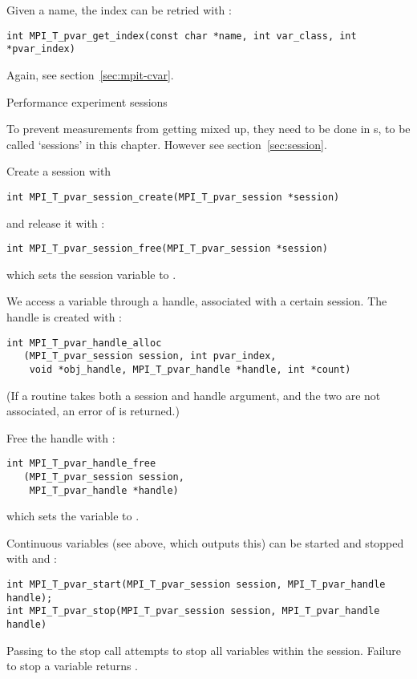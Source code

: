Given a name, the index can be retried with :
\begin{lstlisting}
int MPI_T_pvar_get_index(const char *name, int var_class, int *pvar_index)
\end{lstlisting}
Again, see section~\ref{sec:mpit-cvar}.

 {Performance experiment sessions}

To prevent measurements from getting mixed up, they need to be done in
s,
to be called `sessions' in this chapter.
However see section~\ref{sec:session}.

Create a session with 
\begin{lstlisting}
int MPI_T_pvar_session_create(MPI_T_pvar_session *session)
\end{lstlisting}
and release it with :
\begin{lstlisting}
int MPI_T_pvar_session_free(MPI_T_pvar_session *session)
\end{lstlisting}
which sets the session variable to .

We access a variable through a handle, associated with a certain session.
The handle is created with :
\begin{lstlisting}
int MPI_T_pvar_handle_alloc
   (MPI_T_pvar_session session, int pvar_index,
    void *obj_handle, MPI_T_pvar_handle *handle, int *count)
\end{lstlisting}
(If a routine takes both a session and handle argument, and
the two are not associated, an error of 
is returned.)

Free the handle with :
\begin{lstlisting}
int MPI_T_pvar_handle_free
   (MPI_T_pvar_session session,
    MPI_T_pvar_handle *handle)
\end{lstlisting}
which sets the variable to .

Continuous variables (see  above, which outputs this)
can be started and stopped with
 and :
\begin{lstlisting}
int MPI_T_pvar_start(MPI_T_pvar_session session, MPI_T_pvar_handle handle);
int MPI_T_pvar_stop(MPI_T_pvar_session session, MPI_T_pvar_handle handle)
\end{lstlisting}
Passing  to the stop call
attempts to stop all variables within the session.
Failure to stop a variable returns .

